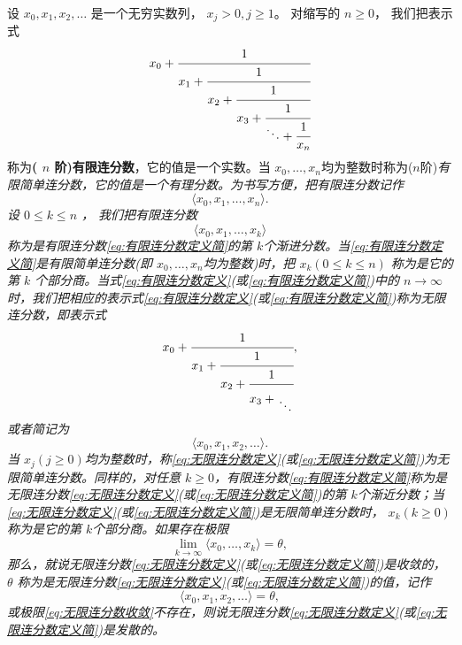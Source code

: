 \begin{definition}
	设 \( x_0, x_1, x_2, \dots \) 是一个无穷实数列， \( x_j > 0, j \ge 1 \)。 对缩写的 \( n \ge 0 \)， 我们把表示式
	\begin{equation}\label{eq:有限连分数定义}
		x_0 +
		\cfrac{1}{x_1 +
			\cfrac{1}{x_2 +
				\cfrac{1}{x_3 +
					\cfrac{1}{\ddots +
						\cfrac{1}{x_n}
					}}}}
	\end{equation}
	称为\textbf{( \( n \) 阶)有限连分数}，它的值是一个实数。当 \( x_0, \dots, x_n
	\)均为整数时称为($n$阶)\em{有限简单连分数}，它的值是一个有理分数。为书写方便，把有限连分数记作
	\begin{equation}
		\langle x_0,x_1,\dots,x_n\rangle.
		\label{eq:有限连分数定义简}
	\end{equation}
	设 \( 0 \le k \le n \) ， 我们把有限连分数
	\begin{equation}
		\langle x_0, x_1, \dots, x_k\rangle
		\label{eq:第k个渐近分数}
	\end{equation}
	称为是有限连分数\eqref{eq:有限连分数定义简}的第 \( k \)个渐进分数。当\eqref{eq:有限连分数定义简}是有限简单连分数(即 \( x_0,\dots,x_n
	\)均为整数)时，把 \( x_k(0 \le k \le n) \) 称为是它的第 \( k \)
	个部分商。当式\eqref{eq:有限连分数定义}(或\eqref{eq:有限连分数定义简})中的 \( n \to \infty
	\)时，我们把相应的表示式\eqref{eq:有限连分数定义}(或\eqref{eq:有限连分数定义简})称为无限连分数，即表示式
	\begin{equation}\label{eq:无限连分数定义}
		x_0 + \cfrac{1}{x_1 +
			\cfrac{1}{x_2 +
				\cfrac{1}{x_3 +
					\genfrac{}{}{0pt}{}{\vphantom{1}}{\ddots}
				}}},
	\end{equation}
	或者简记为
	\begin{equation}
		\langle x_0, x_1, x_2, \dots\rangle.
		\label{eq:无限连分数定义简}
	\end{equation}
	当 \( x_j(j \ge 0) \)均为整数时，称\eqref{eq:无限连分数定义}(或\eqref{eq:无限连分数定义简})为无限简单连分数。同样的，对任意
	\( k \ge 0
	\)，有限连分数\eqref{eq:有限连分数定义简}称为是无限连分数\eqref{eq:无限连分数定义}(或\eqref{eq:无限连分数定义简})的第 \( k
	\)个渐近分数；当\eqref{eq:无限连分数定义}(或\eqref{eq:无限连分数定义简})是无限简单连分数时， \( x_k(k \ge 0) \)称为是它的第
	\( k \)个部分商。如果存在极限
	\begin{equation}
		\lim_{k\to\infty}\langle x_0,\dots,x_k\rangle = \theta,
		\label{eq:无限连分数收敛}
	\end{equation}
	那么，就说无限连分数\eqref{eq:无限连分数定义}(或\eqref{eq:无限连分数定义简})是收敛的， \( \theta \)
	称为是无限连分数\eqref{eq:无限连分数定义}(或\eqref{eq:无限连分数定义简})的值，记作
	\begin{equation}
		\langle x_0,x_1,x_2,\dots\rangle = \theta,
		\label{eq:无限连分数值}
	\end{equation}
	或极限\eqref{eq:无限连分数收敛}不存在，则说无限连分数\eqref{eq:无限连分数定义}(或\eqref{eq:无限连分数定义简})是发散的。
\end{definition}
